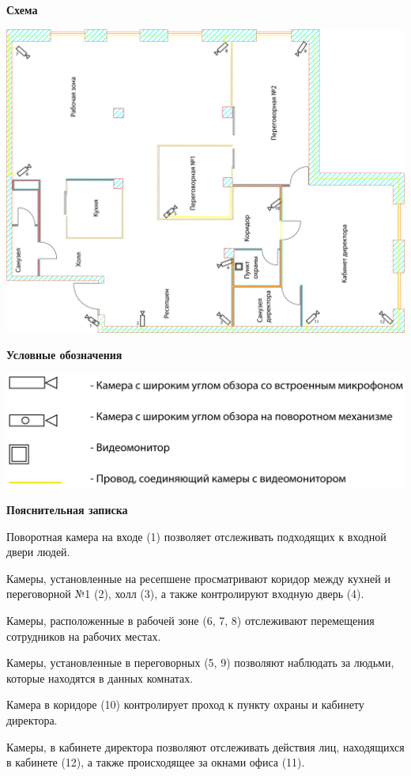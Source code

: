 \documentclass[a4paper,14pt]{extarticle}
\begin{document}
    \begin{center}
        \textbf{Схема}
    \end{center}
    \vspace{-6ex}
    \begin{center}
        \includegraphics[scale=0.65]{pics/Cams.png}
    \end{center}
    \textbf{Условные обозначения}
    \begin{center}
        \includegraphics[scale=0.65]{pics/Cams(mark).png}
    \end{center}
    \textbf{Пояснительная записка}
    \begin{spacing}{1.25}
        Поворотная камера на входе (1) позволяет отслеживать подходящих к входной двери людей.

        Камеры, установленные на ресепшене просматривают коридор между кухней и переговорной №1 (2), холл (3), а также контролируют входную дверь (4).

        Камеры, расположенные в рабочей зоне (6, 7, 8) отслеживают перемещения сотрудников на рабочих местах. 

        Камеры, установленные в переговорных (5, 9) позволяют наблюдать за людьми, которые находятся в данных комнатах.

        Камера в коридоре (10)  контролирует проход к пункту охраны и кабинету директора.

        Камеры, в кабинете директора позволяют отслеживать действия лиц, находящихся в кабинете (12), а также происходящее за окнами офиса (11). 
    \end{spacing}
\end{document}
